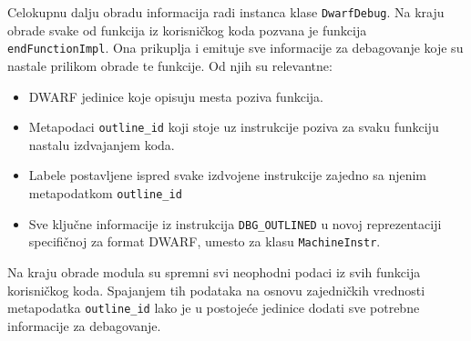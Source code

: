 \documentclass[12pt,oneside]{memoir}
\begin{document}
Celokupnu dalju obradu informacija radi instanca klase \verb|DwarfDebug|.
Na kraju obrade svake od funkcija iz korisničkog koda pozvana je funkcija \verb|endFunctionImpl|.
Ona prikuplja i emituje sve informacije za debagovanje koje su nastale prilikom obrade te funkcije.
Od njih su relevantne:
\begin{itemize}
  \item DWARF jedinice koje opisuju mesta poziva funkcija.
  \item Metapodaci \verb|outline_id| koji stoje uz instrukcije poziva za svaku funkciju nastalu izdvajanjem koda.
  \item Labele postavljene ispred svake izdvojene instrukcije zajedno sa njenim metapodatkom \verb|outline_id|
  \item Sve ključne informacije iz instrukcija \verb|DBG_OUTLINED| u novoj reprezentaciji specifičnoj za format DWARF, umesto za klasu \verb|MachineInstr|.
\end{itemize}
Na kraju obrade modula su spremni svi neophodni podaci iz svih funkcija korisničkog koda.
Spajanjem tih podataka na osnovu zajedničkih vrednosti metapodatka \verb|outline_id| lako je u postojeće jedinice dodati sve potrebne informacije za debagovanje.

\end{document}

